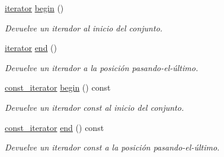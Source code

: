 \begin{DoxyCompactItemize}
\mbox{\hyperlink{classlinear__set_1_1iterator}{iterator}} \mbox{\hyperlink{classlinear__set_a80bad302b65a43aba2a0fbf5e4637a59}{begin}} ()
\begin{DoxyCompactList}\small\item\em Devuelve un iterador al inicio del conjunto. \end{DoxyCompactList}\item 
\mbox{\hyperlink{classlinear__set_1_1iterator}{iterator}} \mbox{\hyperlink{classlinear__set_aa16e2607ba7bc80c86eda9f2301d194d}{end}} ()
\begin{DoxyCompactList}\small\item\em Devuelve un iterador a la posición pasando-\/el-\/último. \end{DoxyCompactList}\item 
\mbox{\hyperlink{classlinear__set_1_1const__iterator}{const\+\_\+iterator}} \mbox{\hyperlink{classlinear__set_ab75a525c9d40b5dc9c301c47095b0f9f}{begin}} () const
\begin{DoxyCompactList}\small\item\em Devuelve un iterador const al inicio del conjunto. \end{DoxyCompactList}\item 
\mbox{\hyperlink{classlinear__set_1_1const__iterator}{const\+\_\+iterator}} \mbox{\hyperlink{classlinear__set_a63decaa5799e90e2f40ee786b44e0263}{end}} () const
\begin{DoxyCompactList}\small\item\em Devuelve un iterador const a la posición pasando-\/el-\/último. \end{DoxyCompactList}\end{DoxyCompactItemize}
